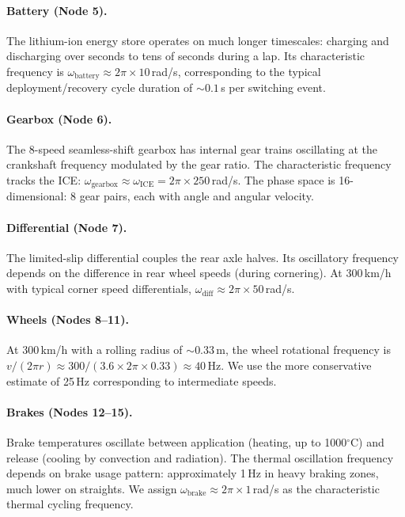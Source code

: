\documentclass[twocolumn,10pt,a4paper]{article}
\theoremstyle{definition}
\theoremstyle{remark}
\begin{document}
\paragraph{Battery (Node 5).} The lithium-ion energy store operates on much longer timescales: charging and discharging over seconds to tens of seconds during a lap. Its characteristic frequency is $\omega_{\mathrm{battery}} \approx 2\pi \times 10$\,rad/s, corresponding to the typical deployment/recovery cycle duration of $\sim 0.1$\,s per switching event.

\paragraph{Gearbox (Node 6).} The 8-speed seamless-shift gearbox has internal gear trains oscillating at the crankshaft frequency modulated by the gear ratio. The characteristic frequency tracks the ICE: $\omega_{\mathrm{gearbox}} \approx \omega_{\mathrm{ICE}} = 2\pi \times 250$\,rad/s. The phase space is 16-dimensional: 8 gear pairs, each with angle and angular velocity.

\paragraph{Differential (Node 7).} The limited-slip differential couples the rear axle halves. Its oscillatory frequency depends on the difference in rear wheel speeds (during cornering). At 300\,km/h with typical corner speed differentials, $\omega_{\mathrm{diff}} \approx 2\pi \times 50$\,rad/s.

\paragraph{Wheels (Nodes 8--11).} At 300\,km/h with a rolling radius of $\sim 0.33$\,m, the wheel rotational frequency is $v/(2\pi r) \approx 300/(3.6 \times 2\pi \times 0.33) \approx 40$\,Hz. We use the more conservative estimate of 25\,Hz corresponding to intermediate speeds.

\paragraph{Brakes (Nodes 12--15).} Brake temperatures oscillate between application (heating, up to 1000$^\circ$C) and release (cooling by convection and radiation). The thermal oscillation frequency depends on brake usage pattern: approximately 1\,Hz in heavy braking zones, much lower on straights. We assign $\omega_{\mathrm{brake}} \approx 2\pi \times 1$\,rad/s as the characteristic thermal cycling frequency.
\end{document}
